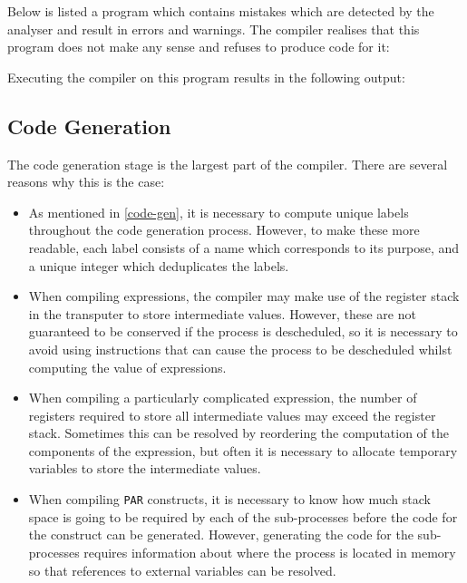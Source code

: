 Below is listed a program which contains mistakes which are detected by the
analyser and result in errors and warnings. The compiler realises that this
program does not make any sense and refuses to produce code for it:

Executing the compiler on this program results in the following output:


\subsection{Code Generation}

The code generation stage is the largest part of the compiler. There are several
reasons why this is the case:

\begin{itemize}
  \item
    As mentioned in \ref{code-gen}, it is necessary to compute unique labels
    throughout the code generation process. However, to make these more
    readable, each label consists of a name which corresponds to its purpose,
    and a unique integer which deduplicates the labels.
  \item
    When compiling expressions, the compiler may make use of the register stack
    in the transputer to store intermediate values. However, these are not
    guaranteed to be conserved if the process is descheduled, so it is necessary
    to avoid using instructions that can cause the process to be descheduled
    whilst computing the value of expressions.
  \item
    When compiling a particularly complicated expression, the number of
    registers required to store all intermediate values may exceed the register
    stack. Sometimes this can be resolved by reordering the computation of the
    components of the expression, but often it is necessary to allocate
    temporary variables to store the intermediate values.
  \item
    When compiling \texttt{PAR} constructs, it is necessary to know how much
    stack space is going to be required by each of the sub-processes before the
    code for the construct can be generated. However, generating the code for
    the sub-processes requires information about where the process is located in
    memory so that references to external variables can be resolved.
    

\end{itemize}
